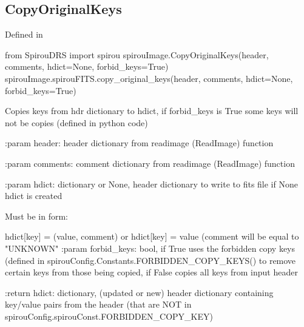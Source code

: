 
\begin{minipage}{\textwidth}
\subsection{CopyOriginalKeys}

Defined in \spirouImage{}

\begin{pythonbox}
from SpirouDRS import spirou
spirouImage.CopyOriginalKeys(header, comments, hdict=None, forbid_keys=True)
spirouImage.spirouFITS.copy_original_keys(header, comments, hdict=None, forbid_keys=True)
\end{pythonbox}

\begin{pythondocstring}
Copies keys from hdr dictionary to hdict, if forbid_keys is True some
keys will not be copies (defined in python code)

:param header: header dictionary from readimage (ReadImage) function

:param comments: comment dictionary from readimage (ReadImage) function

:param hdict: dictionary or None, header dictionary to write to fits file
              if None hdict is created

            Must be in form:

                    hdict[key] = (value, comment)
            or
                    hdict[key] = value     (comment will be equal to
                                            "UNKNOWN"
:param forbid_keys: bool, if True uses the forbidden copy keys (defined in
                    spirouConfig.Constants.FORBIDDEN_COPY_KEYS() to remove
                    certain keys from those being copied, if False copies
                    all keys from input header

:return hdict: dictionary, (updated or new) header dictionary containing
               key/value pairs from the header (that are NOT in
               spirouConfig.spirouConst.FORBIDDEN_COPY_KEY)
\end{pythondocstring}
\end{minipage}



